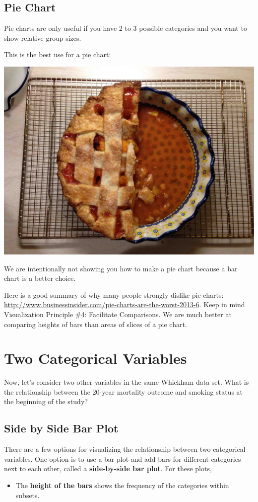 \documentclass[
]{book}
\providecommand{\tightlist}{%
  \setlength{\itemsep}{0pt}\setlength{\parskip}{0pt}}
\begin{document}
\hypertarget{pie-chart}{%
\subsection{Pie Chart}\label{pie-chart}}

Pie charts are only useful if you have 2 to 3 possible categories and you want to show relative group sizes.

This is the best use for a pie chart:

\includegraphics[width=.25\textwidth]{Photos/pie}

We are intentionally not showing you how to make a pie chart because a bar chart is a better choice.

Here is a good summary of why many people strongly dislike pie charts: \url{http://www.businessinsider.com/pie-charts-are-the-worst-2013-6}. Keep in mind Visualization Principle \#4: Facilitate Comparisons. We are much better at comparing heights of bars than areas of slices of a pie chart.

\hypertarget{two-categorical-variables}{%
\section{Two Categorical Variables}\label{two-categorical-variables}}

Now, let's consider two other variables in the same Whickham data set. What is the relationship between the 20-year mortality outcome and smoking status at the beginning of the study?

\hypertarget{side-by-side-bar-plot}{%
\subsection{Side by Side Bar Plot}\label{side-by-side-bar-plot}}

There are a few options for visualizing the relationship between two categorical variables. One option is to use a bar plot and add bars for different categories next to each other, called a \textbf{side-by-side bar plot}. For these plots,

\begin{itemize}
\tightlist
\item
  The \textbf{height of the bars} shows the frequency of the categories within subsets.
\end{itemize}
\end{document}
